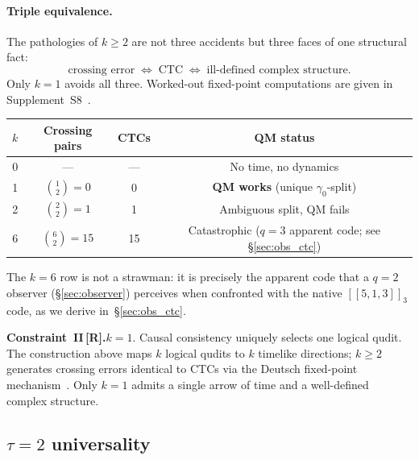 \documentclass[11pt,a4paper]{article}
\newcommand{\Rmark}{\textcolor{green!50!black}{\textbf{[R]}}}
\newcommand{\Cq}[4]{[\![#1,#2,#3]\!]_{#4}}
\begin{document}
\paragraph{Triple equivalence.} The pathologies of $k\geq2$ are not three accidents but three faces of one structural fact:
\[
  \text{crossing error} \;\Longleftrightarrow\; \text{CTC} \;\Longleftrightarrow\; \text{ill-defined complex structure}.
\]
Only $k=1$ avoids all three. Worked-out fixed-point computations are given in Supplement~S8~\cite{Hubka2026QSDSupp}.

\begin{center}
\renewcommand{\arraystretch}{1.25}
\begin{tabular}{cccc}
\toprule
$k$ & Crossing pairs & CTCs & QM status \\
\midrule
0 & --- & --- & No time, no dynamics \\
1 & $\binom{1}{2}=0$ & 0 & \textbf{QM works} (unique $\gamma_0$-split) \\
2 & $\binom{2}{2}=1$ & 1 & Ambiguous split, QM fails \\
6 & $\binom{6}{2}=15$ & 15 & Catastrophic ($q=3$ apparent code; see \S\ref{sec:obs_ctc}) \\
\bottomrule
\end{tabular}
\end{center}

\noindent
The $k=6$ row is not a strawman: it is precisely the apparent code that a $q=2$ observer (\S\ref{sec:observer}) perceives when confronted with the native $\Cq{5}{1}{3}{3}$ code, as we derive in~\S\ref{sec:obs_ctc}.

\begin{mdframed}[backgroundcolor=Rbg,linecolor=Rcolor,linewidth=1.5pt]
\textbf{Constraint~II\,\Rmark.}\quad $k=1$. Causal consistency uniquely selects one logical qudit. The construction above maps $k$ logical qudits to $k$ timelike directions; $k\geq2$ generates crossing errors identical to CTCs via the Deutsch fixed-point mechanism~\cite{Deutsch1991}. Only $k=1$ admits a single arrow of time and a well-defined complex structure.
\end{mdframed}

\subsection{$\tau=2$ universality}
\label{sec:T2}
\end{document}
